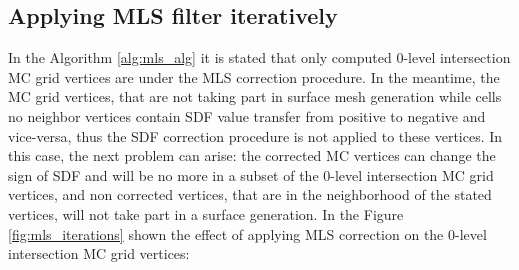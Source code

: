 \subsection{Applying MLS filter iteratively}
In the Algorithm \ref{alg:mls_alg} it is stated that only computed 0-level intersection MC grid vertices are under the MLS correction procedure. In the meantime, the MC grid vertices, that are not taking part in surface mesh generation while cells no neighbor vertices contain SDF value transfer from positive to negative and vice-versa, thus the SDF correction procedure is not applied to these vertices. In this case, the next problem can arise: the corrected MC vertices can change the sign of SDF and will be no more in a subset of the 0-level intersection MC grid vertices, and non corrected vertices, that are in the neighborhood of the stated vertices, will not take part in a surface generation. In the Figure \ref{fig:mls_iterations} shown the effect of applying MLS correction on the 0-level intersection MC grid vertices:
